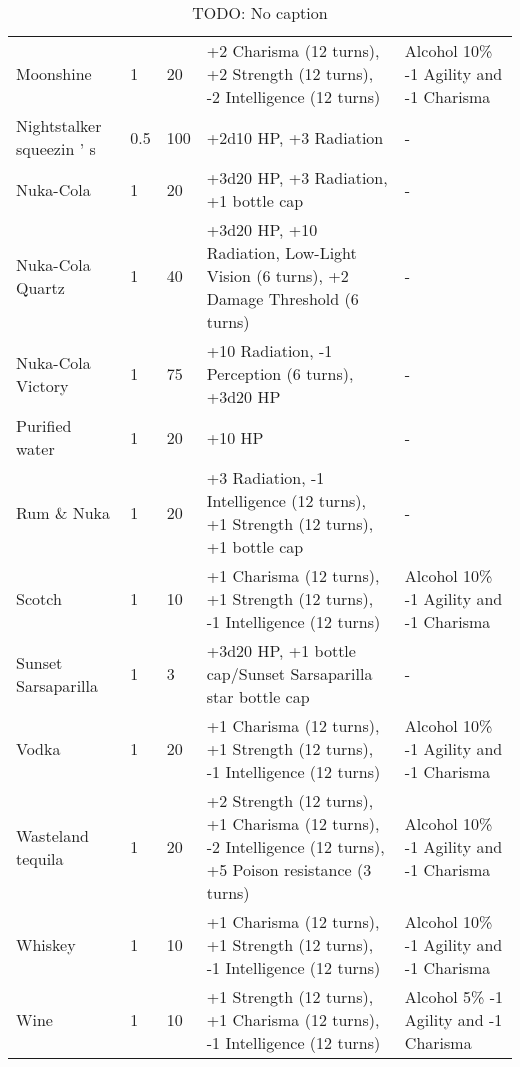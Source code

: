 \documentclass{report}
\begin{document}
\begin{table}[H]
\begin{table}[H]
\begin{table}[H]
\begin{table}[H]
\begin{table}[H]
\begin{table}[H]
\begin{table}[H]
\begin{table}[H]
\begin{table}[H]
\begin{table}[H]
\begin{table}[H]
\begin{table}[H]
\begin{table}[H]
\begin{table}[H]
\begin{table}[H]
\begin{table}[H]
\begin{tabular}{p{30mm}p{30mm}p{30mm}p{30mm}p{30mm}}
Moonshine  & 1 & 20 & +2 Charisma (12 turns), +2 Strength (12 turns), -2 Intelligence (12 turns)  & Alcohol  10\% -1 Agility and -1 Charisma  \\
Nightstalker squeezin ' s  & 0.5  & 100 & +2d10 HP, +3 Radiation & -  \\
Nuka-Cola  & 1 & 20 & +3d20 HP, +3 Radiation, +1  bottle cap  & -  \\
Nuka-Cola Quartz  & 1 & 40 & +3d20 HP, +10 Radiation, Low-Light Vision (6 turns), +2 Damage Threshold (6 turns)  & -  \\
Nuka-Cola Victory  & 1 & 75 & +10 Radiation, -1 Perception (6 turns), +3d20 HP  & -  \\
Purified water  & 1 & 20 & +10 HP & -  \\
Rum  \&  Nuka  & 1 & 20 & +3 Radiation, -1 Intelligence (12 turns), +1 Strength (12 turns), +1 bottle cap  & -  \\
Scotch  & 1 & 10 & +1 Charisma (12 turns), +1 Strength (12 turns), -1 Intelligence (12 turns)  & Alcohol  10\% -1 Agility and -1 Charisma  \\
Sunset Sarsaparilla  & 1 & 3 & +3d20 HP, +1 bottle cap/Sunset Sarsaparilla star bottle cap  & -  \\
Vodka  & 1 & 20 & +1 Charisma (12 turns), +1 Strength (12 turns), -1 Intelligence (12 turns)  & Alcohol  10\% -1 Agility and -1 Charisma  \\
Wasteland tequila  & 1 & 20 & +2 Strength (12 turns), +1 Charisma (12 turns), -2 Intelligence (12 turns), +5 Poison resistance (3 turns)  & Alcohol  10\% -1 Agility and -1 Charisma  \\
Whiskey  & 1 & 10 & +1 Charisma (12 turns), +1 Strength (12 turns), -1 Intelligence (12 turns) & Alcohol  10\% -1 Agility and -1 Charisma  \\
Wine  & 1 & 10 & +1 Strength (12 turns), +1 Charisma (12 turns), -1 Intelligence (12 turns)  & Alcohol  5\% -1 Agility and -1 Charisma  \\
  \end{tabular}
  \caption{TODO: No caption}
  \label{tab:3}
\end{table}

\end{table}
\end{table}
\end{table}
\end{table}
\end{table}
\end{table}
\end{table}
\end{table}
\end{table}
\end{table}
\end{table}
\end{table}
\end{table}
\end{table}
\end{table}
\end{document}
